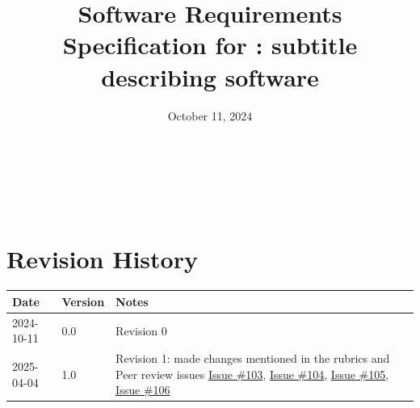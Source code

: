 \documentclass[12pt]{article}
\begin{document}
\title{Software Requirements Specification for \progname: subtitle describing software} 
\author{\authname}
\date{October 11, 2024}
	
\maketitle

~\newpage


\tableofcontents

~\newpage

\section*{Revision History}

\begin{tabularx}{\textwidth}{p{3cm}p{2cm}X}
\toprule {\textbf{Date}} & {\textbf{Version}} & {\textbf{Notes}}\\
\midrule
2024-10-11 & 0.0 & Revision 0\\
2025-04-04 & 1.0 & Revision 1: made changes mentioned in the rubrics and Peer review issues \href{https://github.com/AhmedAl-Hayali/GenreGuru/issues/103}{Issue \#103}, \href{https://github.com/AhmedAl-Hayali/GenreGuru/issues/104}{Issue \#104}, \href{https://github.com/AhmedAl-Hayali/GenreGuru/issues/105}{Issue \#105}, \href{https://github.com/AhmedAl-Hayali/GenreGuru/issues/106}{Issue \#106} \\
\bottomrule
\end{tabularx}

\end{document}

